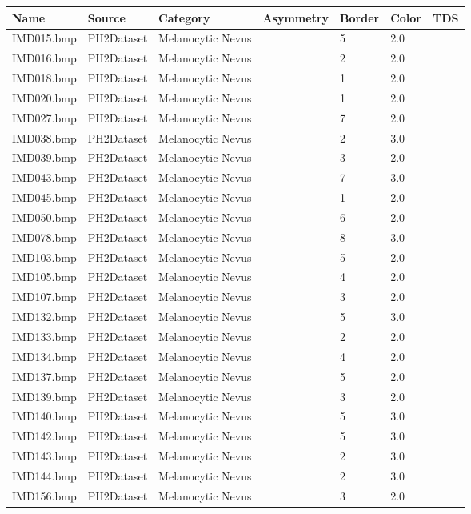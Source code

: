 \begin{longtable}{ | l | l | l | l | l | l | l |}
\hline
Name & Source & Category & Asymmetry & Border & Color & TDS \\ \hline
IMD015.bmp & PH2Dataset & Melanocytic Nevus & & 5 & 2.0 & \\
IMD016.bmp & PH2Dataset & Melanocytic Nevus & & 2 & 2.0 & \\
IMD018.bmp & PH2Dataset & Melanocytic Nevus & & 1 & 2.0 & \\
IMD020.bmp & PH2Dataset & Melanocytic Nevus & & 1 & 2.0 & \\
IMD027.bmp & PH2Dataset & Melanocytic Nevus & & 7 & 2.0 & \\
IMD038.bmp & PH2Dataset & Melanocytic Nevus & & 2 & 3.0 & \\
IMD039.bmp & PH2Dataset & Melanocytic Nevus & & 3 & 2.0 & \\
IMD043.bmp & PH2Dataset & Melanocytic Nevus & & 7 & 3.0 & \\
IMD045.bmp & PH2Dataset & Melanocytic Nevus & & 1 & 2.0 & \\
IMD050.bmp & PH2Dataset & Melanocytic Nevus & & 6 & 2.0 & \\
IMD078.bmp & PH2Dataset & Melanocytic Nevus & & 8 & 3.0 & \\
IMD103.bmp & PH2Dataset & Melanocytic Nevus & & 5 & 2.0 & \\
IMD105.bmp & PH2Dataset & Melanocytic Nevus & & 4 & 2.0 & \\
IMD107.bmp & PH2Dataset & Melanocytic Nevus & & 3 & 2.0 & \\
IMD132.bmp & PH2Dataset & Melanocytic Nevus & & 5 & 3.0 & \\
IMD133.bmp & PH2Dataset & Melanocytic Nevus & & 2 & 2.0 & \\
IMD134.bmp & PH2Dataset & Melanocytic Nevus & & 4 & 2.0 & \\
IMD137.bmp & PH2Dataset & Melanocytic Nevus & & 5 & 2.0 & \\
IMD139.bmp & PH2Dataset & Melanocytic Nevus & & 3 & 2.0 & \\
IMD140.bmp & PH2Dataset & Melanocytic Nevus & & 5 & 3.0 & \\
IMD142.bmp & PH2Dataset & Melanocytic Nevus & & 5 & 3.0 & \\
IMD143.bmp & PH2Dataset & Melanocytic Nevus & & 2 & 3.0 & \\
IMD144.bmp & PH2Dataset & Melanocytic Nevus & & 2 & 3.0 & \\
IMD156.bmp & PH2Dataset & Melanocytic Nevus & & 3 & 2.0 & \\

\end{longtable}
